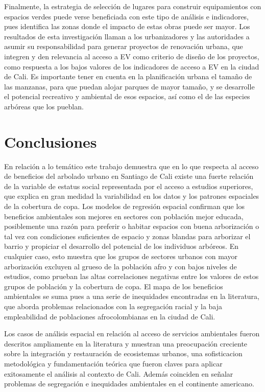 \documentclass[12pt,a4paper,openany]{book}
\theoremstyle{definition}
\theoremstyle{definition}
\theoremstyle{definition}
\theoremstyle{remark}
\begin{document}
Finalmente, la estrategia de selección de lugares para construir
equipamientos con espacios verdes puede verse beneficiada con este tipo
de análisis e indicadores, pues identifica las zonas donde el impacto de
estas obras puede ser mayor. Los resultados de esta investigación llaman
a los urbanizadores y las autoridades a asumir su responsabilidad para
generar proyectos de renovación urbana, que integren y den relevancia al
acceso a EV como criterio de diseño de los proyectos, como respuesta a
los bajos valores de los indicadores de acceso a EV en la ciudad de
Cali. Es importante tener en cuenta en la planificación urbana el tamaño
de las manzanas, para que puedan alojar parques de mayor tamaño, y se
desarrolle el potencial recreativo y ambiental de esos espacios, así
como el de las especies arbóreas que los pueblan.

\chapter{Conclusiones}\label{conclusiones}

En relación a lo temático este trabajo demuestra que en lo que respecta
al acceso de beneficios del arbolado urbano en Santiago de Cali existe
una fuerte relación de la variable de estatus social representada por el
acceso a estudios superiores, que explica en gran medidad la
variabilidad en los datos y los patrones espaciales de la cobertura de
copa. Los modelos de regresión espacial confirman que los beneficios
ambientales son mejores en sectores con población mejor educada,
posiblemente una razón para preferir o habitar espacios con buena
arborización o tal vez con condiciones suficientes de espacio y zonas
blandas para arborizar el barrio y propiciar el desarrollo del potencial
de los individuos arbóreos. En cualquier caso, esto muestra que los
grupos de sectores urbanos con mayor arborización excluyen al grueso de
la población afro y con bajos niveles de estudios, como prueban las
altas correlaciones negativas entre los valores de estos grupos de
población y la cobertura de copa. El mapa de los beneficios ambientales
se suma pues a una serie de inequidades encontradas en la literatura,
que aborda problemas relacionados con la segregación racial y la baja
empleabilidad de poblaciones afrocolombianas en la ciudad de Cali.

Los casos de análisis espacial en relación al acceso de servicios
ambientales fueron descritos ampliamente en la literatura y muestran una
preocupación creciente sobre la integración y restauración de
ecosistemas urbanos, una sofisticacion metodológica y fundamentación
teórica que fueron claves para aplicar exitosamente el análisis al
contexto de Cali. Además coinciden en señalar problemas de segregación e
inequidades ambientales en el continente americano.
\end{document}

